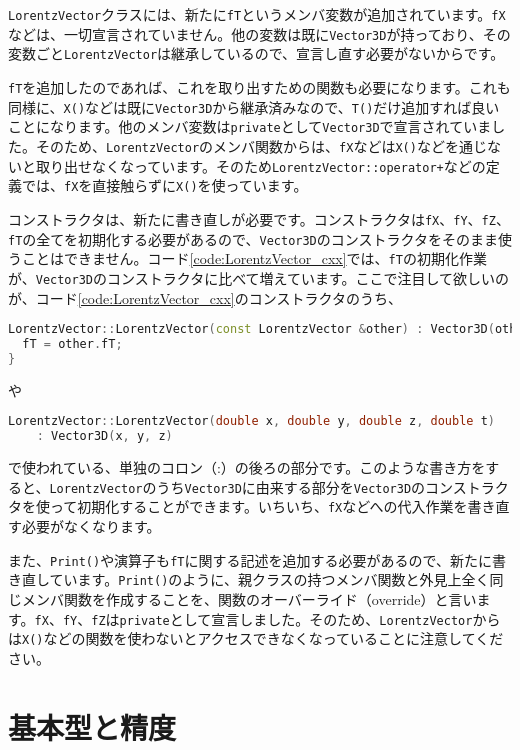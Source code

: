 \texttt{LorentzVector}クラスには、新たに\texttt{fT}というメンバ変数が追加されています。\texttt{fX}などは、一切宣言されていません。他の変数は既に\texttt{Vector3D}が持っており、その変数ごと\texttt{LorentzVector}は継承しているので、宣言し直す必要がないからです。

\texttt{fT}を追加したのであれば、これを取り出すための関数も必要になります。これも同様に、\texttt{X()}などは既に\texttt{Vector3D}から継承済みなので、\texttt{T()}だけ追加すれば良いことになります。他のメンバ変数は\texttt{private}として\texttt{Vector3D}で宣言されていました。そのため、\texttt{LorentzVector}のメンバ関数からは、\texttt{fX}などは\texttt{X()}などを通じないと取り出せなくなっています。そのため\texttt{LorentzVector::operator+}などの定義では、\texttt{fX}を直接触らずに\texttt{X()}を使っています。

コンストラクタは、新たに書き直しが必要です。コンストラクタは\texttt{fX}、\texttt{fY}、\texttt{fZ}、\texttt{fT}の全てを初期化する必要があるので、\texttt{Vector3D}のコンストラクタをそのまま使うことはできません。コード\ref{code:LorentzVector_cxx}では、\texttt{fT}の初期化作業が、\texttt{Vector3D}のコンストラクタに比べて増えています。ここで注目して欲しいのが、コード\ref{code:LorentzVector_cxx}のコンストラクタのうち、
\begin{lstlisting}[language=c++]
LorentzVector::LorentzVector(const LorentzVector &other) : Vector3D(other) {
  fT = other.fT;
}
\end{lstlisting}
や
\begin{lstlisting}[language=c++]
LorentzVector::LorentzVector(double x, double y, double z, double t)
    : Vector3D(x, y, z)
\end{lstlisting}
で使われている、単独のコロン（:）の後ろの部分です。このような書き方をすると、\texttt{LorentzVector}のうち\texttt{Vector3D}に由来する部分を\texttt{Vector3D}のコンストラクタを使って初期化することができます。いちいち、\texttt{fX}などへの代入作業を書き直す必要がなくなります。

また、\texttt{Print()}や演算子も\texttt{fT}に関する記述を追加する必要があるので、新たに書き直しています。\texttt{Print()}のように、親クラスの持つメンバ関数と外見上全く同じメンバ関数を作成することを、関数のオーバーライド（override）と言います。\texttt{fX}、\texttt{fY}、\texttt{fZ}は\texttt{private}として宣言しました。そのため、\texttt{LorentzVector}からは\texttt{X()}などの関数を使わないとアクセスできなくなっていることに注意してください。

\section{基本型と精度}
\label{sec:primitive}

